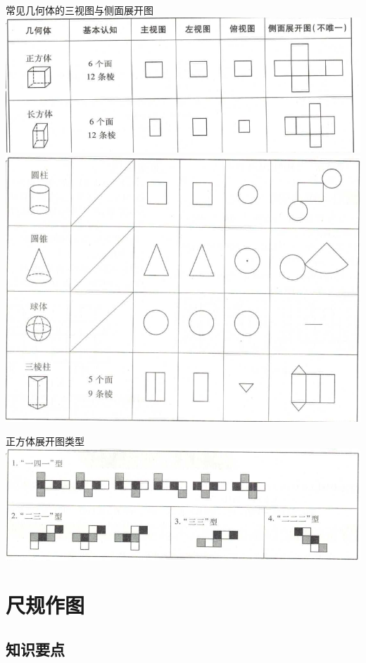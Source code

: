 \documentclass[cn,blue,12pt]{elegantbook}
\begin{document}
\begin{zsyd}
\item 常见几何体的三视图与侧面展开图\\
    \includegraphics[width=0.8\linewidth]{pic/20200515002.png}\\
    \includegraphics[width=0.8\linewidth]{pic/20200515003.png}\\
\item 正方体展开图类型\\

    \includegraphics[width=0.8\linewidth]{pic/20200515004.png}\\
\end{zsyd}

\chapter{尺规作图}%
\label{cha:尺规作图}

\section{知识要点}%
\label{sec:知识要点}
\end{document}
